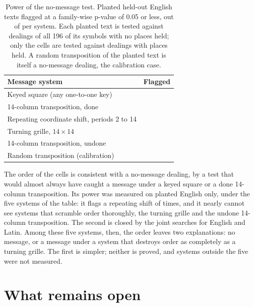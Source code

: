 \documentclass[11pt]{article}
\theoremstyle{definition}
\begin{document}
\begin{table}[t]
\centering
\caption{Power of the no-message test. Planted held-out English texts flagged at a family-wise p-value of 0.05 or less, out of \nmPlanted{} per system. Each planted text is tested against \nmPlantNull{} dealings of all 196 of its symbols with no places held; only the cells are tested against \nmCellNull{} dealings with \nmFixed{} places held. A random transposition of the planted text is itself a no-message dealing, the calibration case.}
\label{tab:nomessage}
\small
\begin{tabular}{@{}lc@{}}
\toprule
Message system & Flagged \\
\midrule
Keyed square (any one-to-one key) & \nmSquare{} \\
14-column transposition, done & \nmDone{} \\
Repeating coordinate shift, periods 2 to 14 & \nmShift{} \\
Turning grille, $14 \times 14$ & \nmGrille{} \\
14-column transposition, undone & \nmUndone{} \\
Random transposition (calibration) & \nmRandom{} \\
\bottomrule
\end{tabular}
\end{table}

The order of the cells is consistent with a no-message dealing, by a test that would almost always have caught a message under a keyed square or a done 14-column transposition. Its power was measured on planted English only, under the five systems of the table: it flags a repeating shift \nmShift{} of \nmPlanted{} times, and it nearly cannot see systems that scramble order thoroughly, the turning grille and the undone 14-column transposition. The second is closed by the joint searches for English and Latin. Among these five systems, then, the order leaves two explanations: no message, or a message under a system that destroys order as completely as a turning grille. The first is simpler; neither is proved, and systems outside the five were not measured.

\section{What remains open}\label{sec:open}
\end{document}
